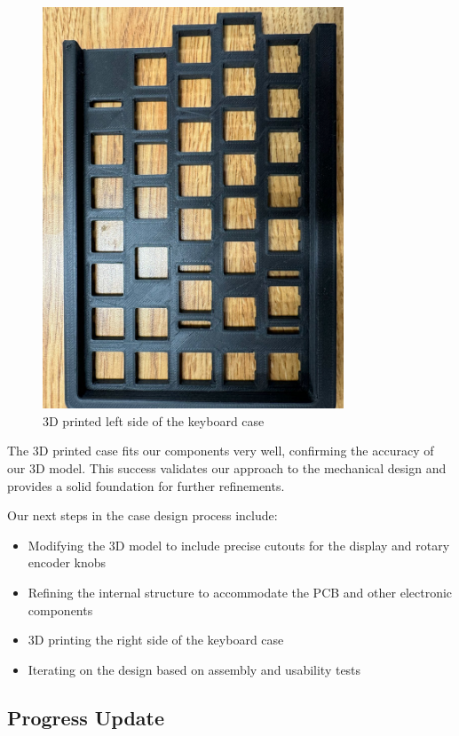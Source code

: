 \documentclass[a4paper,11pt]{article}%
\begin{document}
\begin{figure}[H]
    \centering
    \includegraphics[width=0.8\textwidth]{figures/Update_4/3d1}
    \caption{3D printed left side of the keyboard case}
\end{figure}

The 3D printed case fits our components very well, confirming the accuracy of our 3D model. This success validates our approach to the mechanical design and provides a solid foundation for further refinements.

Our next steps in the case design process include:

\begin{itemize}
    \item Modifying the 3D model to include precise cutouts for the display and rotary encoder knobs
    \item Refining the internal structure to accommodate the PCB and other electronic components
    \item 3D printing the right side of the keyboard case
    \item Iterating on the design based on assembly and usability tests
\end{itemize}


\subsection{Progress Update}
\end{document}
